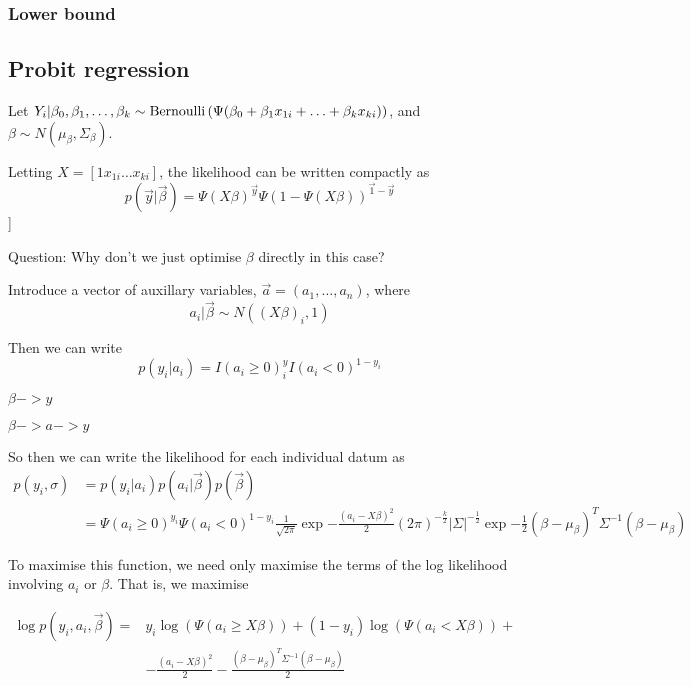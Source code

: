 \documentclass{amsart}
\begin{document}
\subsubsection{Lower bound}

\subsection{Probit regression}
Let $Y_i|\beta_0, \beta_1, \ldots, \beta_k \sim \text{Bernoulli} \left( \Psi(\beta_0 + \beta_1 x_{1i} + \ldots + \beta_k x_{ki}) \right)$, and $\beta \sim N(\mu_\beta, \Sigma_\beta)$.

Letting $X = [1 x_{1i} \ldots x_{ki}]$, the likelihood can be written compactly as
\[
p(\vec{y}|\vec{\beta}) = \Psi(X \beta)^{\vec{y}} \Psi(1 - \Psi(X \beta))^{\vec{1} - \vec{y}}
\]]

Question: Why don't we just optimise $\beta$ directly in this case?

Introduce a vector of auxillary variables, $\vec{a} = (a_1, \ldots, a_n)$, where
\[
a_i | \vec{\beta} \sim N((X\beta)_i, 1)
\]

Then we can write
\[
p(y_i|a_i) = I(a_i \geq 0)^y_i I(a_i < 0)^{1-y_i}
\]

$\beta -> y$

$\beta -> a -> y$

So then we can write the likelihood for each individual datum as
\begin{align*}
	p(y_i, \sigma) &= p(y_i|a_i) p(a_i|\vec{\beta}) p(\vec{\beta}) \\
	&= \Psi(a_i \geq 0)^{y_i} \Psi(a_i < 0)^{1 - y_i} \frac{1}{\sqrt{2 \pi}} \exp{- \frac{(a_i - X \beta)^2}{2}} \left( 2 \pi \right)^{-\frac{k}{2}} |\Sigma|^{-\frac{1}{2}} \exp{-\frac{1}{2} (\beta - \mu_\beta)^T \Sigma^{-1} (\beta - \mu_\beta)}
\end{align*}

To maximise this function, we need only maximise the terms of the log likelihood
involving $a_i$ or $\beta$. That is, we maximise

\begin{align*}
\log{p(y_i, a_i, \vec{\beta})} =& y_i \log{(\Psi(a_i \geq X \beta))} + (1 - y_i) \log{(\Psi(a_i < X \beta))} + \\
&- \frac{(a_i - X \beta)^2}{2} - \frac{(\beta - \mu_\beta)^T \Sigma^{-1} (\beta - \mu_\beta)}{2}
\end{align*}
\end{document}
